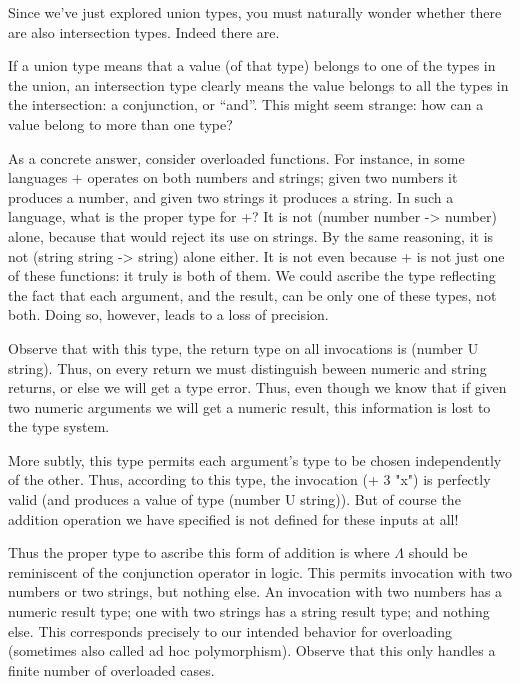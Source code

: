 
Since we’ve just explored union types, you must naturally wonder whether there
are also intersection types. Indeed there are.

If a union type means that a value (of that type) belongs to one of the types in
the union, an intersection type clearly means the value belongs to all the types
in the intersection: a conjunction, or “and”. This might seem strange: how can a
value belong to more than one type?

As a concrete answer, consider overloaded functions. For instance, in some
languages + operates on both numbers and strings; given two numbers it produces
a number, and given two strings it produces a string. In such a language, what
is the proper type for +? It is not (number number -> number) alone, because
that would reject its use on strings. By the same reasoning, it is not (string
string -> string) alone either. It is not even
because + is not just one of these functions: it truly is both of them. We could
ascribe the type
reflecting the fact that each argument, and the result, can be only one of these
types, not both. Doing so, however, leads to a loss of precision.


Observe that with this type, the return type on all invocations is (number U
string). Thus, on every return we must distinguish beween numeric and string
returns, or else we will get a type error. Thus, even though we know that if
given two numeric arguments we will get a numeric result, this information is
lost to the type system.

More subtly, this type permits each argument’s type to be chosen independently
of the other. Thus, according to this type, the invocation (+ 3 "x") is
perfectly valid (and produces a value of type (number U string)). But of course
the addition operation we have specified is not defined for these inputs at all!

Thus the proper type to ascribe this form of addition is
where $\Lambda$ should be reminiscent of the conjunction operator in logic. This
permits invocation with two numbers or two strings, but nothing else. An
invocation with two numbers has a numeric result type; one with two strings has
a string result type; and nothing else. This corresponds precisely to our
intended behavior for overloading (sometimes also called ad hoc polymorphism).
Observe that this only handles a finite number of overloaded cases.
